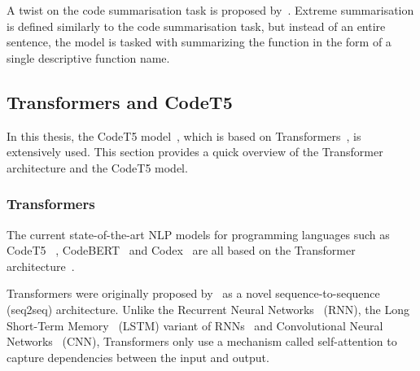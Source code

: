 A twist on the code summarisation task is proposed by~\citeauthor{ExtremeSummarization}. Extreme summarisation is defined similarly to the code summarisation task, but instead of an entire sentence, the model is tasked with summarizing the function in the form of a single descriptive function name.

\subsection{Transformers and CodeT5}
In this thesis, the CodeT5 model~\cite{CodeT5}, which is based on Transformers~\cite{Transformers}, is extensively used. This section provides a quick overview of the Transformer architecture and the CodeT5 model.

\subsubsection{Transformers}
The current state-of-the-art NLP models for programming languages such as CodeT5 ~\cite{CodeT5}, CodeBERT~\cite{CodeBERT} and Codex~\cite{CodeX} are all based on the Transformer architecture~\cite{Transformers}.

Transformers were originally proposed by~\citeauthor{Transformers} as a novel sequence-to-sequence~\cite{seq2seq} (seq2seq) architecture. Unlike the Recurrent Neural Networks~\cite{RNN} (RNN), the Long Short-Term Memory~\cite{LSTM} (LSTM) variant of RNNs~\cite{RNN} and Convolutional Neural Networks~\cite{CNN} (CNN), Transformers only use a mechanism called self-attention to capture dependencies between the input and output. 

